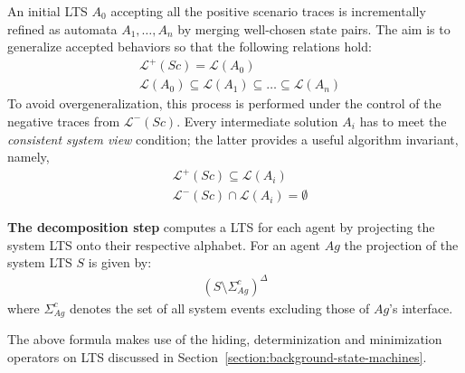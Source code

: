 An initial LTS $A_0$ accepting all the positive scenario traces is incrementally refined as automata $A_1,\ldots,A_n$ by merging well-chosen state pairs. The aim is to generalize accepted behaviors so that the following relations hold:
\begin{align}
&\mathcal{L}^+(Sc) = \mathcal{L}(A_0) \\
&\mathcal{L}(A_0) \subseteq \mathcal{L}(A_1) \subseteq \ldots \subseteq \mathcal{L}(A_n)
\label{relation:inductive-language-refinements}
\end{align}
To avoid overgeneralization, this process is performed under the control of the negative traces from $\mathcal{L}^-(Sc)$. Every intermediate solution $A_i$ has to meet the \emph{consistent system view} condition; the latter provides a useful algorithm invariant, namely,
\begin{align}
&\mathcal{L}^+(Sc) \subseteq \mathcal{L}(A_i)        \label{relation:inductive-invariant}\\
&\mathcal{L}^-(Sc) \cap \mathcal{L}(A_i) = \emptyset \label{relation:inductive-invariant-II}
\end{align}

\noindent \textbf{The decomposition step} computes a LTS for each agent by projecting the system LTS onto their respective alphabet. For an agent $Ag$ the projection of the system LTS $S$ is given by:
\begin{align}
(S \setminus \Sigma_{Ag}^c)^\Delta
\end{align}
\noindent where $\Sigma_{Ag}^c$ denotes the set of all system events excluding those of $Ag$'s interface.

The above formula makes use of the hiding, determinization and minimization operators on LTS discussed in Section~\ref{section:background-state-machines}.



